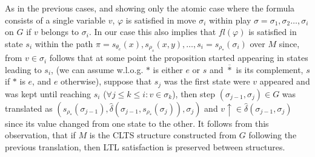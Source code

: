 As in the previous cases, and showing only the atomic case where the formula consists of a single variable $v$, $\varphi$ is satisfied in move $\sigma_i$ within play $\sigma=\sigma_1,\sigma_2\ldots ,\sigma_i$ on $G$ if $v$ belongs to $\sigma_i$. In our case this also implies that $fl(\varphi)$ is satisfied in state $s_i$ within the path $\pi=s_{\theta_e}(x),s_{\rho_s}(x,y),\ldots,s_i=s_{\rho_*}(\sigma_i)$ over $M$ since, from $v \in \sigma_i$ follows that at some point the proposition started appearing in states leading to $s_i$, (we can assume w.l.o.g. $*$ is either $e$ or $s$ and $\overline{*}$ is its complement, $s$ if $*$ is $e$, and $e$ otherwise), suppose that $s_j$ was the first state were $v$ appeared and was kept until reaching $s_i$ ($\forall j \leq k \leq i: v \in \sigma_k$), then step $(\sigma_{j-1},\sigma_j) \in G$ was translated as $(s_{\rho_*}(\sigma_{j-1}), \hat{\delta}(\sigma_{j-1},s_{\rho_{\overline{*}}}(\sigma_j)),\sigma_{j})$ and $v\uparrow \in \hat{\delta}(\sigma_{j-1},\sigma_j)$ since its value changed from one state to the other. It follows from this observation, that if $M$ is the CLTS structure constructed from $G$ following the previous translation, then LTL satisfaction is preserved between structures.
%
%
%
